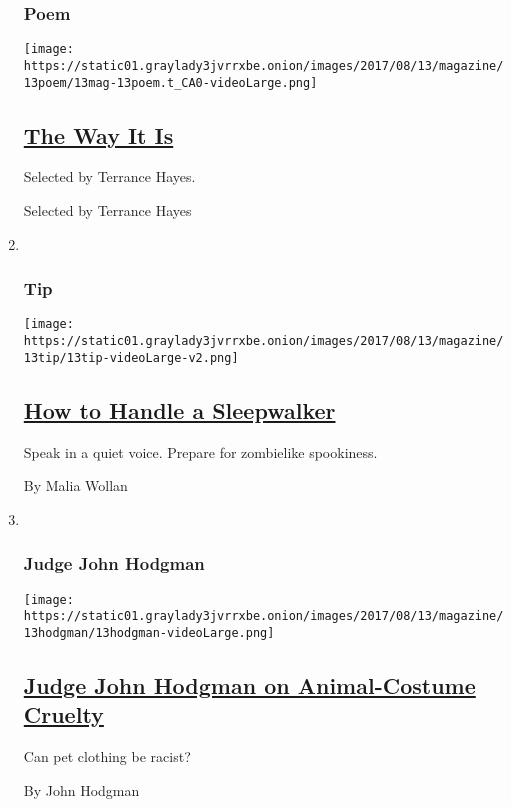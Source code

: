 \begin{enumerate}
{  \subsubsection{Poem}\label{poem}}

  \texttt{[image: https://static01.graylady3jvrrxbe.onion/images/2017/08/13/magazine/13poem/13mag-13poem.t\_CA0-videoLarge.png]}

  \hypertarget{the-way-it-is}{%
  \subsection{\texorpdfstring{\href{/2017/08/11/magazine/the-way-it-is.html}{The
  Way It Is}}{The Way It Is}}\label{the-way-it-is}}

  Selected by Terrance Hayes.

  Selected by Terrance Hayes
\item ~
  \hypertarget{tip}{%
  \subsubsection{Tip}\label{tip}}

  \texttt{[image: https://static01.graylady3jvrrxbe.onion/images/2017/08/13/magazine/13tip/13tip-videoLarge-v2.png]}

  \hypertarget{how-to-handle-a-sleepwalker}{%
  \subsection{\texorpdfstring{\href{/2017/08/11/magazine/how-to-handle-a-sleepwalker.html}{How
  to Handle a
  Sleepwalker}}{How to Handle a Sleepwalker}}\label{how-to-handle-a-sleepwalker}}

  Speak in a quiet voice. Prepare for zombielike spookiness.

  By Malia Wollan
\item ~
  \hypertarget{judge-john-hodgman}{%
  \subsubsection{Judge John Hodgman}\label{judge-john-hodgman}}

  \texttt{[image: https://static01.graylady3jvrrxbe.onion/images/2017/08/13/magazine/13hodgman/13hodgman-videoLarge.png]}

  \hypertarget{judge-john-hodgman-on-animal-costume-cruelty}{%
  \subsection{\texorpdfstring{\href{/2017/08/11/magazine/judge-john-hodgman-on-animal-costume-cruelty.html}{Judge
  John Hodgman on Animal-Costume
  Cruelty}}{Judge John Hodgman on Animal-Costume Cruelty}}\label{judge-john-hodgman-on-animal-costume-cruelty}}

  Can pet clothing be racist?

  By John Hodgman
\end{enumerate}

